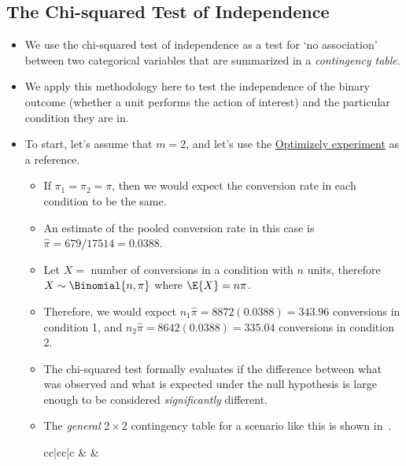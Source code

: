 \subsection{The Chi-squared Test of Independence}
\begin{itemize}
    \item We use the chi-squared test of independence as a test for `no association'
          between two categorical variables that are summarized in a \emph{contingency table}.
    \item We apply this methodology here to test the independence of the binary outcome
          (whether a unit performs the action of interest) and the particular condition they are in.
    \item To start, let's assume that $ m=2 $, and let's use the \hyperref[ex:optimizely_ex1]{Optimizely experiment} as a reference.
          \begin{itemize}
              \item If $ \pi_1=\pi_2=\pi $, then we would expect the conversion rate in each condition to be the same.
              \item An estimate of the pooled conversion rate in this case is $ \hat{\pi}=679/17514=0.0388 $.
              \item Let $ X= $ number of conversions in a condition with $ n $ units, therefore $ X \sim \Binomial{n,\pi} $
                    where $ \E{X}=n\pi $.
              \item Therefore, we would expect $ n_1\hat{\pi}=8872(0.0388)=343.96 $ conversions in condition 1,
                    and $ n_2\hat{\pi}=8642(0.0388)=335.04 $ conversions in condition 2.
              \item The chi-squared test formally evaluates if the difference between what
                    was observed and what is expected under the null hypothesis is large enough
                    to be considered \emph{significantly} different.
              \item The \emph{general} $ 2\times 2 $ contingency table for a scenario like this
                    is shown in~.
                    \begin{table}[!htbp]
                        \centering
                        \caption{A General $ 2\times 2 $ Contingency Table}\label{general_22_contingency}
                        \begin{NiceTabular}{cc|cc|c}
                                    &  &                                                                                       \\

\end{NiceTabular}
\end{table}
\end{itemize}
\end{itemize}
